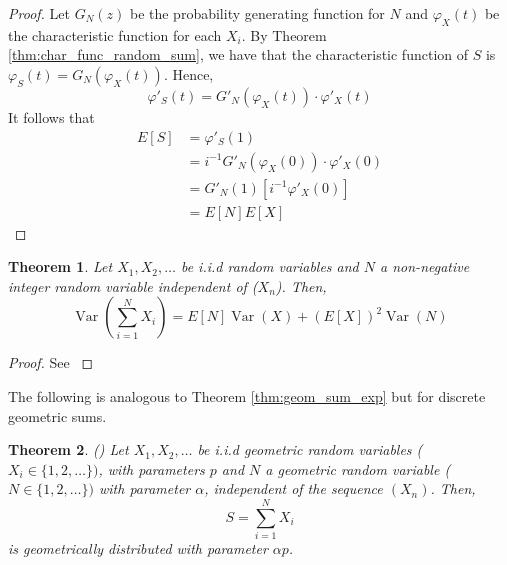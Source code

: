 \documentclass{article}
\theoremstyle{plain}
\newtheorem{theorem}{Theorem}[section]
\theoremstyle{definition}
\theoremstyle{remark}
\numberwithin{equation}{section}
\newcommand{\Var}{\operatorname {Var}}
\begin{document}
\begin{proof}
Let $G_N(z)$  be the probability generating function for $N$ and $\varphi_X(t)$ be the characteristic function for each $X_i$.
By Theorem \ref{thm:char_func_random_sum}, we have that the characteristic function of $S$ is $\varphi_S(t) = G_N(\varphi_X(t))$.
Hence,
$$
\varphi'_S(t) = G'_N(\varphi_X(t)) \cdot \varphi'_X(t)
$$
It follows that
\begin{align*}
    E[S] &= \varphi'_S(1)\\
    &= i^{-1} G'_N(\varphi_X(0)) \cdot \varphi'_X(0)\\
    &= G'_N(1) [i^{-1} \varphi'_X(0)]   \\
    &= E[N] E[X]
\end{align*}

\end{proof}

\begin{theorem} \label{thm:random_sum_var}
Let $X_1, X_2, \ldots$ be i.i.d random variables and $N$ a non-negative integer random variable independent of ($X_n$).
Then,
$$
\Var\left( \sum_{i = 1}^N X_i \right) = E[N]\Var(X) + (E[X])^2 \Var(N)
$$
\end{theorem}

\begin{proof}
See \cite{Ross97}
\end{proof}

The following is analogous to Theorem \ref{thm:geom_sum_exp} but for discrete geometric sums.

\begin{theorem}\label{thm:geom_sum_geom} (\cite{Nelson1995})
Let $X_1, X_2, \ldots$ be i.i.d geometric random variables ($X_i \in \{1,2,\ldots\})$, with parameters $p$ and $N$ a geometric random variable ($N \in \{1,2,\ldots\})$ with parameter $\alpha$, independent of the sequence $(X_n)$.
Then,
$$
S = \sum_{i = 1}^N X_i
$$
is geometrically distributed with parameter $\alpha p$.
\end{theorem}
\end{document}
